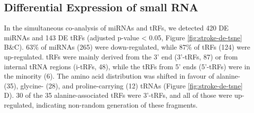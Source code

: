 \subsection{Differential Expression of small RNA}
In the simultaneous co-analysis of miRNAs and tRFs, we detected 420 DE miRNAs and 143 DE tRFs (adjusted p-value < 0.05, Figure \ref{fig:stroke-de-tsne}\,B\&C). 63\% of miRNAs (265) were down-regulated, while 87\% of tRFs (124) were up-regulated. tRFs were mainly derived from the 3' end (3'-tRFs, 87) or from internal tRNA regions (i-tRFs, 48), while the tRFs from 5' ends (5'-tRFs) were in the minority (6). The amino acid distribution was shifted in favour of alanine- (35), glycine- (28), and proline-carrying (12) tRNAs (Figure \ref{fig:stroke-de-tsne}\,D). 30 of the 35 alanine-associated tRFs were 3'-tRFs, and all of those were up-regulated, indicating non-random generation of these fragments.

